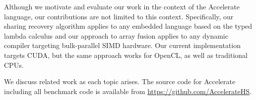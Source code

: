 Although we motivate and evaluate our work in the context of the Accelerate
language, our contributions are not limited to this context. Specifically, our
sharing recovery algorithm applies to any embedded language based on the typed
lambda calculus and our approach to array fusion applies to any dynamic compiler
targeting bulk-parallel SIMD hardware. Our current implementation targets CUDA,
but the same approach works for OpenCL, as well as traditional CPUs.

We discuss related work as each topic arises. The source code for Accelerate
including all benchmark code is available from
\url{https://github.com/AccelerateHS}.


%

